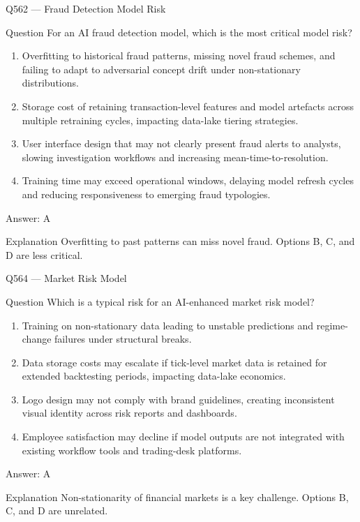 \documentclass[aspectratio=169,8pt]{beamer}
\begin{document}
	\begin{frame}{Q562 --- Fraud Detection Model Risk}
		\begin{block}{Question}
			For an AI fraud detection model, which is the most critical model risk?
			\begin{enumerate}
				\item Overfitting to historical fraud patterns, missing novel fraud schemes, and failing to adapt to adversarial concept drift under non-stationary distributions.
				\item Storage cost of retaining transaction-level features and model artefacts across multiple retraining cycles, impacting data-lake tiering strategies.
				\item User interface design that may not clearly present fraud alerts to analysts, slowing investigation workflows and increasing mean-time-to-resolution.
				\item Training time may exceed operational windows, delaying model refresh cycles and reducing responsiveness to emerging fraud typologies.
			\end{enumerate}
		\end{block}
		\begin{exampleblock}{Answer: A}\end{exampleblock}
		\begin{block}{Explanation}
			Overfitting to past patterns can miss novel fraud. Options B, C, and D are less critical.
		\end{block}
	\end{frame}
	
	
	\begin{frame}{Q564 --- Market Risk Model}
		\begin{block}{Question}
			Which is a typical risk for an AI-enhanced market risk model?
			\begin{enumerate}
				\item Training on non-stationary data leading to unstable predictions and regime-change failures under structural breaks.
				\item Data storage costs may escalate if tick-level market data is retained for extended backtesting periods, impacting data-lake economics.
				\item Logo design may not comply with brand guidelines, creating inconsistent visual identity across risk reports and dashboards.
				\item Employee satisfaction may decline if model outputs are not integrated with existing workflow tools and trading-desk platforms.
			\end{enumerate}
		\end{block}
		\begin{exampleblock}{Answer: A}\end{exampleblock}
		\begin{block}{Explanation}
			Non-stationarity of financial markets is a key challenge. Options B, C, and D are unrelated.
		\end{block}
	\end{frame}
	
\end{document}

